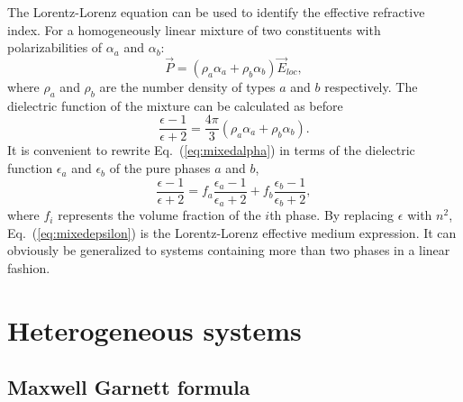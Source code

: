 The Lorentz-Lorenz equation can be used to identify the effective refractive index.
For a homogeneously linear mixture of two constituents with polarizabilities of $\alpha_a$ and $\alpha_b$:
\begin{equation}
\vec{P} = (\rho_a \alpha_a + \rho_b \alpha_b) \vec{E}_{loc},
\end{equation}
where $\rho_a$ and $\rho_b$ are the number density of types $a$ and $b$ respectively.
The dielectric function of the mixture can be calculated as before
\begin{equation}
\label{eq:mixedalpha}
\frac{\epsilon -1}{\epsilon +2} = \frac{4\pi}{3} (\rho_a \alpha_a + \rho_b \alpha_b).
\end{equation}
It is convenient to rewrite Eq.~(\ref{eq:mixedalpha}) in terms of the dielectric function $\epsilon_a$ and $\epsilon_b$ of the pure phases $a$ and $b$,
\begin{equation}
\label{eq:mixedepsilon}
\frac{\epsilon - 1}{\epsilon + 2} = f_a \frac{\epsilon_a - 1}{\epsilon_a + 2} + f_b \frac{\epsilon_b - 1}{\epsilon_b + 2},
\end{equation}
where $f_i$ represents the volume fraction of the $i$th phase.
By replacing $\epsilon$ with $n^2$, Eq.~(\ref{eq:mixedepsilon}) is the Lorentz-Lorenz effective medium expression. It can obviously be generalized to systems containing more than two phases in a linear fashion.

\section{Heterogeneous systems}
\subsection{Maxwell Garnett formula}

